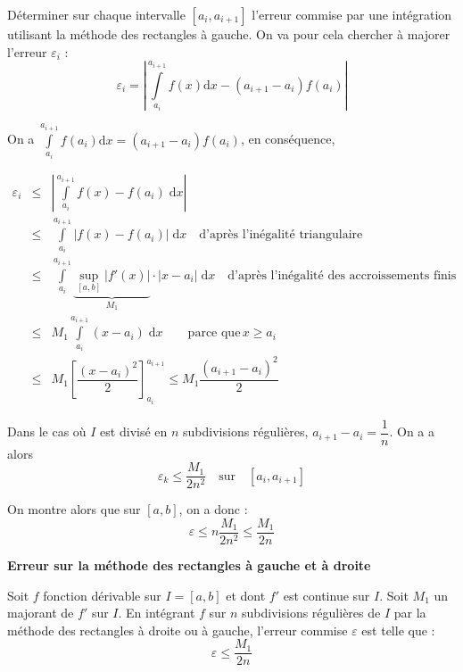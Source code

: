 \documentclass[10pt]{article}
\begin{document}
\begin{Objectif}
Déterminer sur chaque intervalle $[a_i,a_{i+1}]$ l'erreur commise par une intégration utilisant la méthode des rectangles à gauche. On va pour cela chercher à majorer l'erreur $\varepsilon_i$ :
$$
\varepsilon_i = \left| \int\limits_{a_i}^{a_{i+1}}f(x)\mathrm{d}x -\left(a_{i+1}-a_{i}\right) f(a_i)\right|
$$
\end{Objectif}

On a $\int\limits_{a_i}^{a_{i+1}}f(a_i)\mathrm{d}x=\left(a_{i+1}-a_{i}\right) f(a_i)$, en conséquence, 

\allowdisplaybreaks

\begin{eqnarray*}
\varepsilon_i &\leq &  \left| \int\limits_{a_i}^{a_{i+1}}f(x) -  f(a_i) \; \mathrm{d}x\right|  \\
&\leq &   \int\limits_{a_i}^{a_{i+1}} \left| f(x) -  f(a_i) \right|\; \mathrm{d}x \quad \text{d'après l'inégalité triangulaire}\\
&\leq &   \int\limits_{a_i}^{a_{i+1}} \underbrace{\underset{[a,b]}{\sup} \left| f'(x)\right|}_{M_1} \cdot \left| x-a_i\right|  \; \mathrm{d}x \quad \text{d'après l'inégalité des accroissements finis}\\
& \leq & M_1 \int\limits_{a_i}^{a_{i+1}}  \left( x-a_i\right)  \; \mathrm{d}x \quad  \quad \text{parce que}\, x\geq a_i\\
& \leq & M_1   \left[ \dfrac{\left(x-a_i\right)^2}{2}\right]_{a_i}^{a_{i+1}} \leq M_1 \dfrac{\left(a_{i+1}-a_i\right)^2}{2}
\end{eqnarray*}

Dans le cas où $I$ est divisé en $n$ subdivisions régulières, $a_{i+1}-a_i = \dfrac{1}{n}$. On a a alors 
$$
\varepsilon_k \leq \dfrac{M_1}{2n^2} \quad \text{sur}\quad [a_i,a_{i+1}]
$$

On montre alors que sur $[a,b]$, on a donc :
$$
\varepsilon \leq n\dfrac{M_1}{2n^2} \leq \dfrac{M_1}{2n} 
$$


\begin{resultat}
\textbf{Erreur sur la méthode des rectangles à gauche et à droite}

Soit $f$ fonction dérivable sur $I=[a,b]$ et dont $f'$ est continue sur $I$. Soit $M_1$ un majorant de $f'$ sur $I$. En intégrant $f$ sur $n$ subdivisions régulières de $I$ par la méthode des rectangles à droite ou à gauche, l'erreur commise $\varepsilon$ est telle que : 
$$ \varepsilon \leq \dfrac{M_1}{2n}$$ 

\end{resultat}
\end{document}
